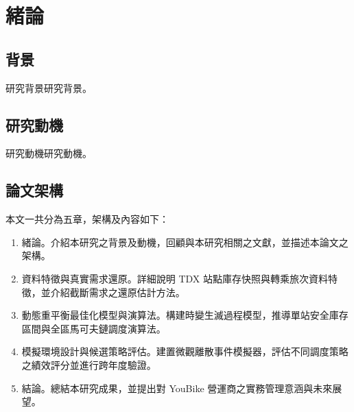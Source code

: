 
\chapter{緒論}\label{chap:introduction}

\section{背景}

研究背景研究背景。

\section{研究動機}

研究動機研究動機。

\section{論文架構}

本文一共分為五章，架構及內容如下：

\begin{enumerate}
    \item[{\hyperref[chap:introduction]{第一章}}] 緒論。介紹本研究之背景及動機，回顧與本研究相關之文獻，並描述本論文之架構。
    \item[{\hyperref[chap:Data & Latent Demand Reconstruction]{第二章}}] 資料特徵與真實需求還原。詳細說明 TDX 站點庫存快照與轉乘旅次資料特徵，並介紹截斷需求之還原估計方法。
    \item[{\hyperref[chap:Dynamic Rebalancing Models & Algorithms]{第三章}}] 動態重平衡最佳化模型與演算法。構建時變生滅過程模型，推導單站安全庫存區間與全區馬可夫鏈調度演算法。
    \item[{\hyperref[chap:Simulation Setup & Policy Evaluation]{第四章}}] 模擬環境設計與候選策略評估。建置微觀離散事件模擬器，評估不同調度策略之績效評分並進行跨年度驗證。
    \item[{\hyperref[chap:Conclusion]{第五章}}] 結論。總結本研究成果，並提出對 YouBike 營運商之實務管理意涵與未來展望。
\end{enumerate}
